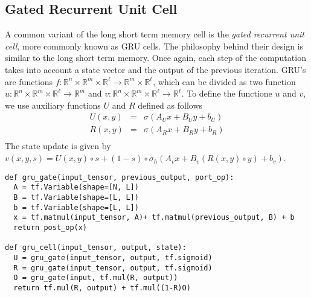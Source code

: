 \documentclass[10pt]{amsart}
\newcommand{\R}{\mathbb{R}}
\theoremstyle{definition}
\begin{document}





\subsection{Gated Recurrent Unit Cell} A common variant of the long short term memory cell is the {\em gated recurrent unit cell}, more commonly known as GRU cells.  The philosophy behind their design is similar to the long short term memory. Once again, each step of the computation takes into account a state vector and the output of the previous iteration. GRU's are functions  $f:\R^n\times \R^m\times \R^{\ell}\to \R^m\times \R^{\ell}$,  which can be divided as two function $u:\R^{n}\times\R^m\times \R^{\ell}\to \R^m$ and $v:\R^n\times \R^m\times\R^{\ell}\to \R^{\ell}$. To define the functione $u$ and $v$, we use auxiliary functions $U$ and  $R$ defined as follows
\begin{eqnarray*}
  U(x, y) &=& \sigma(A_Ux + B_Uy + b_U)\\
  R(x, y) &=& \sigma(A_Rx + B_Ry + b_R)\\
\end{eqnarray*}
The state update is given by $v(x, y, s) = U(x, y)\circ s + (1-s)\circ \sigma_h(A_v x + B_v(R(x, y)\circ y) + b_v)$.

\begin{verbatim}
def gru_gate(input_tensor, previous_output, port_op):
  A = tf.Variable(shape=[N, L])
  B = tf.Variable(shape=[L, L])
  b = tf.Variable(shape=[L, L])
  x = tf.matmul(input_tensor, A)+ tf.matmul(previous_output, B) + b
  return post_op(x)

def gru_cell(input_tensor, output, state):
  U = gru_gate(input_tensor, output, tf.sigmoid)
  R = gru_gate(input_tensor, output, tf.sigmoid)
  O = gru_gate(input, tf.mul(R, output))
  return tf.mul(R, output) + tf.mul((1-R)O)
\end{verbatim}
\end{document}
